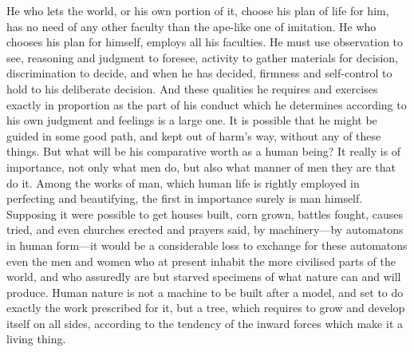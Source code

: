\documentclass[11pt,openany]{book}
\begin{document}
He who lets the world, or his own portion of it, choose his plan of life for him, has no need of any other faculty than the ape-like one of imitation. He who chooses his plan for himself, employs all his faculties. He must use observation to see, reasoning and judgment to foresee, activity to gather materials for decision, discrimination to decide, and when he has decided, firmness and self-control to hold to his deliberate decision. And these qualities he requires and exercises exactly in proportion as the part of his conduct which he determines according to his own judgment and feelings is a large one. It is possible that he might be guided in some good path, and kept out of harm's way, without any of these things. But what will be his comparative worth as a human being? It really is of importance, not only what men do, but also what manner of men they are that do it. Among the works of man, which human life is rightly employed in perfecting and beautifying, the first in importance surely is man himself. Supposing it were possible to get houses built, corn grown, battles fought, causes tried, and even churches erected and prayers said, by machinery---by automatons in human form---it would be a considerable loss to exchange for these automatons even the men and women who at present inhabit the more civilised parts of the world, and who assuredly are but starved specimens of what nature can and will produce. Human nature is not a machine to be built after a model, and set to do exactly the work prescribed for it, but a tree, which requires to grow and develop itself on all sides, according to the tendency of the inward forces which make it a living thing.
\end{document}
